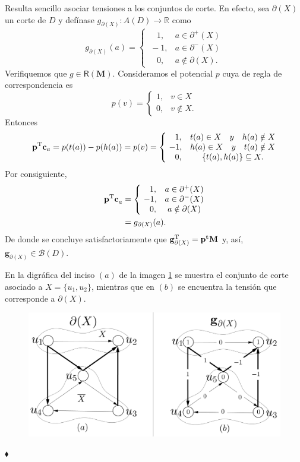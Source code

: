 Resulta sencillo asociar tensiones a los conjuntos de corte. En efecto, sea $\partial(X)$ un corte de $D$ y defínase $g_{\partial(X)}\colon A(D) \rightarrow \mathbb{R}$ como 
$$
g_{\partial(X)}(a) = \left\{\begin{matrix}
\quad1, & a \in \partial^{+}(X)\\ 
\ -1, & a \in \partial^{-}(X)\\
\quad 0, & a \notin \partial(X).
\end{matrix}\right.
$$
Verifiquemos que $g\in \mathsf{R}(\mathbf{M})$. Consideramos el potencial $p$ cuya de regla de correspondencia es
$$
p(v) = \left\{\begin{matrix}
1, & v \in X\\ 
0, & v \notin X.
\end{matrix}\right.
$$
Entonces 
$$
\mathbf{p}^{\textnormal{T}}\mathbf{c}_{a} = p(t(a)) - p(h(a)) = p(v) =
\left\{\begin{matrix}
\quad 1, & t(a) \in X \quad y \quad h(a) \notin X \\ 
\ -1, & h(a) \in X \quad y \quad t(a) \notin X\\
\quad 0, & \{t(a), h(a)\} \subseteq X.
\end{matrix}\right.
$$
Por consiguiente,
\begin{align*}
\mathbf{p^{\textnormal{T}}\mathbf{c}}_{a} &= \left\{\begin{matrix}
\quad1, & a \in \partial^{+}(X)\\ 
\ -1, & a \in \partial^{-}(X)\\
\quad 0, & a \notin \partial(X) 
\end{matrix}\right. 
\\ &= g_{\partial(X)}(a).
\end{align*}
De donde se concluye satisfactoriamente que $\mathbf{g}^{\textnormal{T}}_{\partial(X)} = \mathbf{p^{t}M}$ y, así, $\mathbf{g}_{\partial(X)} \in \mathcal{B}(D)$. 

\begin{ejem}
En la digráfica del inciso $(a)$ de la imagen \ref{fig:tensionesycortes} se muestra el conjunto de corte asociado a $X=\{u_{1},u_{2}\}$, mientras que en $(b)$ se encuentra la tensión que corresponde a $\partial(X)$.

\begin{figure}[H]
    \centering
    \includegraphics[scale = 0.2]{img/imgchapter2/tensionesycortes.jpg}
    \caption{}
    \label{fig:tensionesycortes}
\end{figure}
\hfill $\blacklozenge$
\end{ejem}


